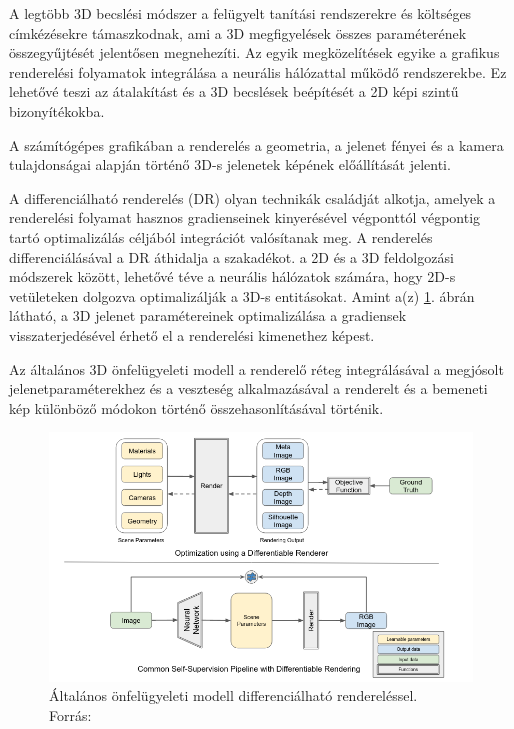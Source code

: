 \documentclass[12pt,a4]{article}
\begin{document}
    A legtöbb 3D becslési módszer a
felügyelt tanítási rendszerekre és költséges címkézésekre támaszkodnak, ami
a 3D megfigyelések összes paraméterének összegyűjtését jelentősen megnehezíti.
Az egyik
megközelítések egyike a grafikus renderelési folyamatok integrálása
a neurális hálózattal működő rendszerekbe. Ez lehetővé teszi az átalakítást és
a 3D becslések beépítését a 2D képi szintű bizonyítékokba.

A számítógépes grafikában a renderelés a geometria, a jelenet fényei és a kamera tulajdonságai alapján történő 3D-s jelenetek képének előállítását jelenti.

A differenciálható renderelés (DR) olyan technikák családját alkotja, amelyek a renderelési folyamat hasznos gradienseinek kinyerésével végponttól végpontig tartó optimalizálás céljából integrációt valósítanak meg. A renderelés differenciálásával a DR áthidalja a szakadékot.
a 2D és a 3D feldolgozási módszerek között, lehetővé téve a neurális hálózatok számára, hogy 2D-s vetületeken dolgozva optimalizálják a 3D-s entitásokat. Amint a(z) \ref{fig:diffrenderer}. ábrán látható, a 3D jelenet paramétereinek optimalizálása a gradiensek visszaterjedésével érhető el a renderelési kimenethez képest. 

Az általános 3D önfelügyeleti modell a renderelő réteg integrálásával a megjósolt jelenetparaméterekhez és a veszteség alkalmazásával a renderelt és a bemeneti kép különböző módokon történő összehasonlításával történik.

    \begin{figure}[h]	
		\centering
		\includegraphics[width=1\linewidth]{diffrenderer}
		\caption{Általános önfelügyeleti modell differenciálható rendereléssel.\\
                Forrás: \cite{diffrenderer}}
        \label{fig:diffrenderer}
	\end{figure}
 \newpage
\end{document}
